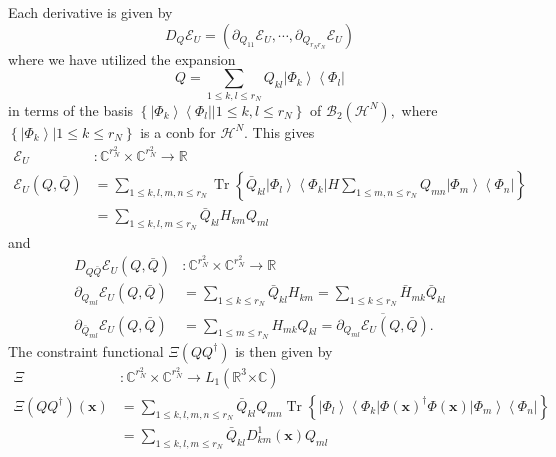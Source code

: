 \documentclass[aps,preprint]{revtex4}%
\begin{document}
Each derivative is given by
\begin{equation}
D_{Q}\mathcal{E}_{U}=\left(  \partial_{Q_{11}}\mathcal{E}_{U},\cdots
,\partial_{Q_{r_{N}r_{N}}}\mathcal{E}_{U}\right)
\end{equation}
where we have utilized the expansion
\begin{equation}
Q=\sum_{1\leq k,l\leq r_{N}}Q_{kl}\left\vert \Phi_{k}\right\rangle
\left\langle \Phi_{l}\right\vert
\end{equation}
in terms of the basis $\left\{  \left.  \left\vert \Phi_{k}\right\rangle
\left\langle \Phi_{l}\right\vert \right\vert 1\leq k,l\leq r_{N}\right\}  $ of
$\mathcal{B}_{2}\left(  \mathcal{H}^{N}\right)  ,$ where $\left\{  \left.
\left\vert \Phi_{k}\right\rangle \right\vert 1\leq k\leq r_{N}\right\}  $ is a
conb for $\mathcal{H}^{N}.$ This gives
\begin{align}
\mathcal{E}_{U} &  :\mathbb{C}^{r_{N}^{2}}\times\mathbb{C}^{r_{N}^{2}%
}\rightarrow\mathbb{R}\nonumber\\
\mathcal{E}_{U}\left(  Q,\bar{Q}\right)   &  =\sum_{1\leq k,l,m,n\leq r_{N}%
}\operatorname{Tr}\left\{  \bar{Q}_{kl}\left\vert \Phi_{l}\right\rangle
\left\langle \Phi_{k}\right\vert H\sum_{1\leq m,n\leq r_{N}}Q_{mn}\left\vert
\Phi_{m}\right\rangle \left\langle \Phi_{n}\right\vert \right\}  \nonumber\\
&  =\sum_{1\leq k,l,m\leq r_{N}}\bar{Q}_{kl}H_{km}Q_{ml}%
\end{align}
and
\begin{align}
D_{Q\bar{Q}}\mathcal{E}_{U}\left(  Q,\bar{Q}\right)   &  :\mathbb{C}%
^{r_{N}^{2}}\times\mathbb{C}^{r_{N}^{2}}\rightarrow\mathbb{R}\nonumber\\
\partial_{Q_{ml}}\mathcal{E}_{U}\left(  Q,\bar{Q}\right)   &  =\sum_{1\leq
k\leq r_{N}}\bar{Q}_{kl}H_{km}=\sum_{1\leq k\leq r_{N}}\bar{H}_{mk}\bar
{Q}_{kl}\nonumber\\
\partial_{\bar{Q}_{ml}}\mathcal{E}_{U}\left(  Q,\bar{Q}\right)   &
=\sum_{1\leq m\leq r_{N}}H_{mk}Q_{kl}=\overline{\partial_{Q_{ml}}%
\mathcal{E}_{U}\left(  Q,\bar{Q}\right)  }.
\end{align}
The constraint functional $\Xi\left(  QQ^{\dagger}\right)  $ is then given by
\begin{align}
\Xi &  :\mathbb{C}^{r_{N}^{2}}\times\mathbb{C}^{r_{N}^{2}}\rightarrow
L_{1}\left(  \mathbb{R}^{3}\mathbb{\times C}\right)  \nonumber\\
\Xi\left(  QQ^{\dagger}\right)  \left(  \mathbf{x}\right)   &  =\sum_{1\leq
k,l,m,n\leq r_{N}}\bar{Q}_{kl}Q_{mn}\operatorname{Tr}\left\{  \left\vert
\Phi_{l}\right\rangle \left\langle \Phi_{k}\right\vert \Phi\left(
\mathbf{x}\right)  ^{\dagger}\Phi\left(  \mathbf{x}\right)  \left\vert
\Phi_{m}\right\rangle \left\langle \Phi_{n}\right\vert \right\}  \nonumber\\
&  =\sum_{1\leq k,l,m\leq r_{N}}\bar{Q}_{kl}D_{km}^{1}\left(  \mathbf{x}%
\right)  Q_{ml}%
\end{align}
\end{document}
